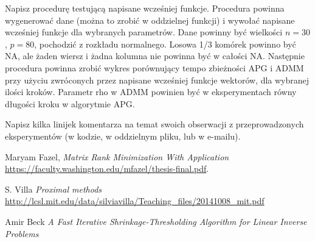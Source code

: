 \documentclass[10pt,a4paper,draft]{report}
\begin{document}
\begin{problem}
Napisz procedurę testującą napisane wcześniej funkcje. Procedura powinna wygenerować dane (można to zrobić w oddzielnej funkcji) i wywołać napisane wcześniej funkcje dla wybranych parametrów. Dane powinny być wielkości $n=30$, $p=80$, pochodzić z rozkładu normalnego. Losowa 1/3 komórek powinno być NA, ale żaden wiersz i żadna kolumna nie powinna być w całości NA.  
Następnie procedura powinna zrobić wykres porównujący tempo zbieżności APG i ADMM przy użyciu zwróconych przez napisane wcześniej funkcje wektorów, dla wybranej ilości kroków. Parametr rho w ADMM powinien być w eksperymentach równy długości kroku w algorytmie APG. 

Napisz kilka linijek komentarza na temat swoich obserwacji z  przeprowadzonych eksperymentów (w kodzie, w oddzielnym pliku, lub w e-mailu).
\end{problem}

\begin{thebibliography}{1}

 Maryam Fazel, {\em Matrix Rank Minimization With Application} \url{https://faculty.washington.edu/mfazel/thesis-final.pdf}.

 S. Villa {\em Proximal methods}
\url{http://lcsl.mit.edu/data/silviavilla/Teaching_files/20141008_mit.pdf}

 Amir Beck {\em A Fast Iterative Shrinkage-Thresholding Algorithm
for Linear Inverse Problems}

\end{thebibliography}
\end{document}
